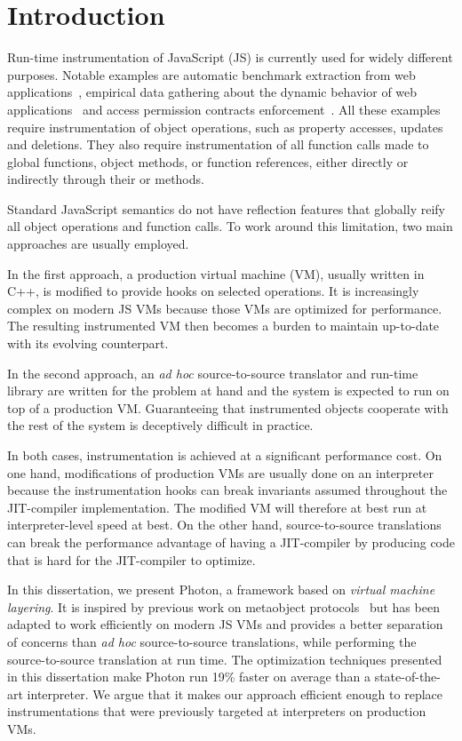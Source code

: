 \chapter{Introduction}

Run-time instrumentation of JavaScript (JS) is currently used for widely different
purposes.  Notable examples are automatic benchmark extraction from web
applications~\cite{Richards:2011}, empirical data gathering about the dynamic
behavior of web applications~\cite{behavior_js} and access permission contracts
enforcement~\cite{Heidegger:2012}. All these examples require instrumentation
of object operations, such as property accesses, updates and deletions. They
also require instrumentation of all function calls made to global functions,
object methods, or function references, either directly or indirectly through
their  or  methods.

Standard JavaScript semantics do not have reflection features that globally
reify all object operations and function calls. To work around this limitation,
two main approaches are usually employed.

In the first approach, a production virtual machine (VM), usually written in
C++, is modified to provide hooks on selected operations. It is increasingly
complex on modern JS VMs because those VMs are optimized for performance. The
resulting instrumented VM then becomes a burden to maintain up-to-date with its
evolving counterpart.

In the second approach, an \textit{ad hoc} source-to-source translator and
run-time library are written for the problem at hand and the system is expected
to run on top of a production VM. Guaranteeing that instrumented objects
cooperate with the rest of the system is deceptively difficult in practice.

In both cases, instrumentation is achieved at a significant performance cost.
On one hand, modifications of production VMs are usually done on an interpreter
because the instrumentation hooks can break invariants assumed throughout the
JIT-compiler implementation. The modified VM will therefore at best run at
interpreter-level speed at best. On the other hand, source-to-source
translations can break the performance advantage of having a JIT-compiler by
producing code that is hard for the JIT-compiler to optimize.

In this dissertation, we present Photon, a framework based on \textit{virtual
machine layering}. It is inspired by previous work on metaobject
protocols~\cite{Kiczales:1991} but has been adapted to work efficiently on
modern JS VMs and provides a better separation of concerns than \textit{ad hoc}
source-to-source translations, while performing the source-to-source translation
at run time.  The optimization techniques presented in this dissertation make
Photon run 19\% faster on average  than a state-of-the-art interpreter. We
argue that it makes our approach efficient enough to replace instrumentations
that were previously targeted at interpreters on production VMs.

